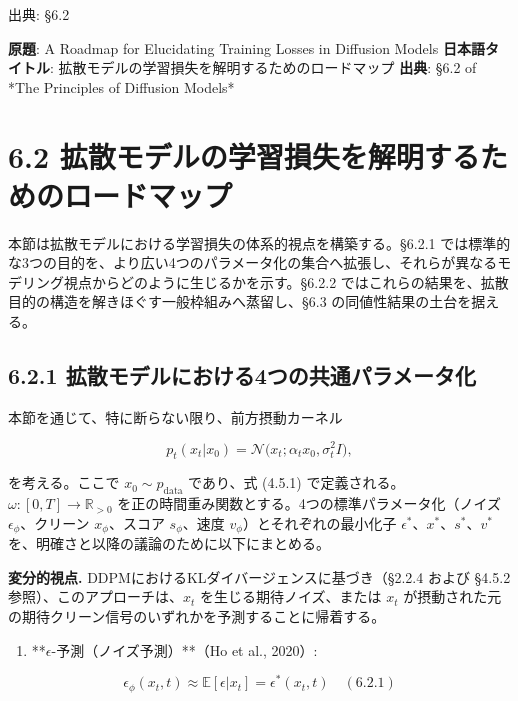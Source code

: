 

{\color{gray}\footnotesize 出典: §6.2\par}
\vspace{0.2em}
\begin{propositionbox}[原題]
\textbf{原題}: A Roadmap for Elucidating Training Losses in Diffusion Models
\textbf{日本語タイトル}: 拡散モデルの学習損失を解明するためのロードマップ
\textbf{出典}: §6.2 of *The Principles of Diffusion Models*
\end{propositionbox}


\section*{6.2 拡散モデルの学習損失を解明するためのロードマップ}


本節は拡散モデルにおける学習損失の体系的視点を構築する。§6.2.1 では標準的な3つの目的を、より広い4つのパラメータ化の集合へ拡張し、それらが異なるモデリング視点からどのように生じるかを示す。§6.2.2 ではこれらの結果を、拡散目的の構造を解きほぐす一般枠組みへ蒸留し、§6.3 の同値性結果の土台を据える。

\subsection*{6.2.1 拡散モデルにおける4つの共通パラメータ化}


本節を通じて、特に断らない限り、前方摂動カーネル

\[
p_t(x_t|x_0) = \mathcal{N}\bigl(x_t; \alpha_t x_0, \sigma_t^2 I\bigr),
\]


を考える。ここで $x_0 \sim p_{\mathrm{data}}$ であり、式 (4.5.1) で定義される。
$\omega: [0,T] \to \mathbb{R}_{>0}$ を正の時間重み関数とする。4つの標準パラメータ化（ノイズ $\epsilon_\phi$、クリーン $x_\phi$、スコア $s_\phi$、速度 $v_\phi$）とそれぞれの最小化子 $\epsilon^*$、$x^*$、$s^*$、$v^*$ を、明確さと以降の議論のために以下にまとめる。

\textbf{変分的視点.} DDPMにおけるKLダイバージェンスに基づき（§2.2.4 および §4.5.2 参照）、このアプローチは、$x_t$ を生じる期待ノイズ、または $x_t$ が摂動された元の期待クリーン信号のいずれかを予測することに帰着する。

\begin{enumerate}
\item **$\epsilon$-予測（ノイズ予測）**（Ho et al., 2020）:
\end{enumerate}

\[
\epsilon_\phi(x_t, t) \approx \mathbb{E}[\epsilon|x_t] = \epsilon^*(x_t, t) \quad (6.2.1)
\]

